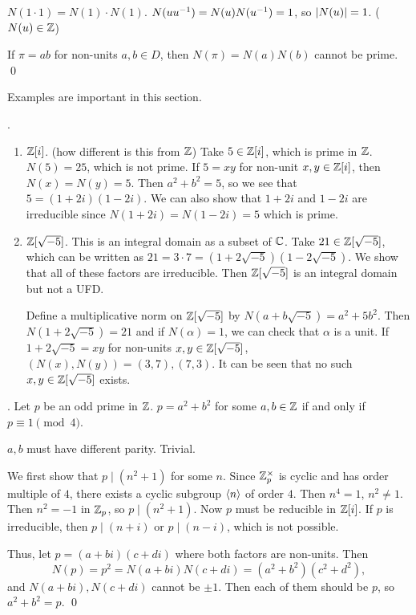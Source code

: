 \pf {} \(N(1 \cdot 1) = N(1) \cdot N(1)\). \(N(u u^{-1}) = N(u) N(u^{-1}) = 1\), so \(\left| N(u) \right| = 1\). (\(N(u) \in \mathbb{Z}\))

 If \(\pi = ab\) for non-units \(a, b \in D\), then \(N(\pi) = N(a)N(b)\) cannot be prime. \qed

Examples are important in this section.

\ex.
\begin{enumerate}
    \item \(\mathbb{Z}[i]\). (how different is this from \(\mathbb{Z}\)) Take \(5 \in \mathbb{Z}[i]\), which is prime in \(\mathbb{Z}\). \(N(5) = 25\), which is not prime. If \(5 = xy\) for non-unit \(x, y \in \mathbb{Z}[i]\), then \(N(x) = N(y) = 5\). Then \(a^2 + b^2 = 5\), so we see that \(5 = (1 + 2i)(1 - 2i)\). We can also show that \(1 + 2i\) and \(1 - 2i\) are irreducible since \(N(1 + 2i) = N(1-2i) = 5\) which is prime.

    \item \(\mathbb{Z}[\sqrt{-5}]\). This is an integral domain as a subset of \(\mathbb{C}\). Take \(21 \in \mathbb{Z}[\sqrt{-5}]\), which can be written as \(21 = 3 \cdot 7 = (1 + 2\sqrt{-5})(1 - 2\sqrt{-5})\). We show that all of these factors are irreducible. Then \(\mathbb{Z}[\sqrt{-5}]\) is an integral domain but not a UFD.

          Define a multiplicative norm on \(\mathbb{Z}[\sqrt{-5}]\) by \(N(a + b\sqrt{-5}) = a^2 + 5b^2\). Then \(N(1 + 2\sqrt{-5}) = 21\) and if \(N(\alpha) = 1\), we can check that \(\alpha\) is a unit. If \(1 + 2\sqrt{-5} = xy\) for non-units \(x, y \in \mathbb{Z}[\sqrt{-5}]\), \((N(x), N(y)) = (3, 7), (7, 3)\). It can be seen that no such \(x, y \in \mathbb{Z}[\sqrt{-5}]\) exists.
\end{enumerate}

\thm.  Let \(p\) be an odd prime in \(\mathbb{Z}\). \(p = a^2 + b^2\) for some \(a, b \in \mathbb{Z}\) if and only if \(p \equiv 1 \pmod 4\).

\pf \note{\mimp} \(a, b\) must have different parity. Trivial.

\note{\mimpd} We first show that \(p \mid (n^2 + 1)\) for some \(n\). Since \(\mathbb{Z}_p^\times\) is cyclic and has order multiple of \(4\), there exists a cyclic subgroup \(\left\langle n \right\rangle\) of order \(4\). Then \(n^4 = 1\), \(n^2 \neq 1\). Then \(n^2 = -1\) in \(\mathbb{Z}_p\), so \(p \mid (n^2 + 1)\). Now \(p\) must be reducible in \(\mathbb{Z}[i]\). If \(p\) is irreducible, then \(p \mid (n + i)\) or \(p \mid (n - i)\), which is not possible.

Thus, let \(p = (a + bi)(c + di)\) where both factors are non-units. Then
\[
    N(p) = p^2 = N(a + bi)N(c + di) = (a^2 + b^2)(c^2 + d^2),
\]
and \(N(a+bi), N(c+di)\) cannot be \(\pm 1\). Then each of them should be \(p\), so \(a^2 + b^2 = p\). \qed

\pagebreak
